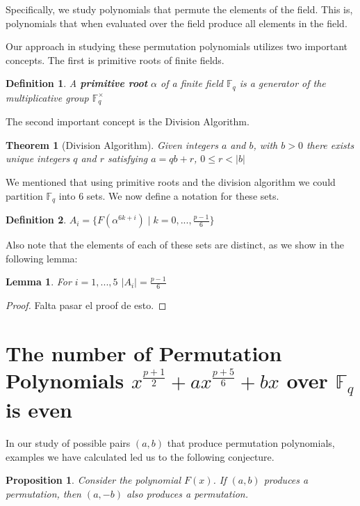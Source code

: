 \documentclass[12pt]{article}
\newtheorem{definition}{Definition}
\newtheorem{proposition}{Proposition}
\newtheorem{lemma}{Lemma}
\newtheorem{theorem}{Theorem}
\begin{document}
Specifically, we study polynomials that permute the elements of the field. This is, polynomials that when evaluated over the field produce all elements in the field.


Our approach in studying these permutation polynomials utilizes two important concepts. The first is primitive roots of finite fields.
\begin{definition}
	A \textbf{primitive root} $\alpha$ of a finite field $\mathbb{F}_{q}$ is a generator of the multiplicative group $\mathbb{F}_{q}^{\times}$
\end{definition}

The second important concept is the Division Algorithm.
\begin{theorem}[Division Algorithm]
	Given integers $a$ and $b$, with $b>0$ there exists unique integers $q$ and $r$ satisfying $a=qb+r$, $0 \leq r < |b|$
\end{theorem}

We mentioned that using primitive roots and the division algorithm we could partition $\mathbb{F}_{q}$ into $6$ sets. We now define a notation for these sets.

\begin{definition}
	$A_{i}=\lbrace F(\alpha^{6k+i}) \mid k=0,...,\frac{p-1}{6}\rbrace$
\end{definition}

Also note that the elements of each of these sets are distinct, as we show in the following lemma:
\begin{lemma}
	For $i=1,...,5$ $\left\vert A_{i} \right\vert = \frac{p-1}{6}$
\end{lemma}

\begin{proof}
	Falta pasar el proof de esto.
\end{proof}

\section{The number of Permutation Polynomials $x^{\frac{p+1}{2}} + ax^{\frac{p+5}{6}} + bx$ over $\mathbb{F}_{q}$ is even}\label{divby2}


In our study of possible pairs $(a,b)$ that produce permutation polynomials, examples we have calculated led us to the following conjecture.
\begin{proposition}
	Consider the polynomial $F(x)$. If $(a,b)$ produces a permutation, then $(a,-b)$ also produces a permutation.
\end{proposition}
\end{document}
